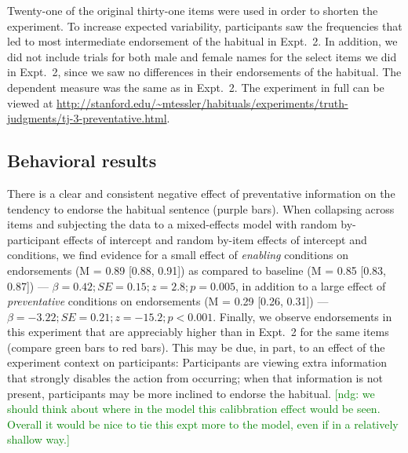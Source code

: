 \documentclass[10pt,letterpaper]{article}
\newcommand{\ndg}[1]{\textcolor{Green}{[ndg: #1]}}
\begin{document}
Twenty-one of the original thirty-one items were used in order to shorten the experiment.
To increase expected variability, participants saw the frequencies that led to most intermediate endorsement of the habitual in Expt.~2. 
In addition, we did not include trials for both male and female names for the select items we did in Expt.~2, since we saw no differences in their endorsements of the habitual.
The dependent measure was the same as in Expt.~2. 
The experiment in full can be viewed at \url{http://stanford.edu/~mtessler/habituals/experiments/truth-judgments/tj-3-preventative.html}.

\subsection{Behavioral results}

There is a clear and consistent negative effect of preventative information on the tendency to endorse the habitual sentence (purple bars).
When collapsing across items and subjecting the data to a mixed-effects model with random by-participant effects of intercept and random by-item effects of intercept and conditions, we find evidence for a small effect of \emph{enabling} conditions on endorsements (M =  0.89 [0.88, 0.91]) as compared to baseline (M = 0.85 [0.83, 0.87]) --- $\beta = 0.42; SE = 0.15; z = 2.8; p = 0.005$, in addition to a large effect of \emph{preventative} conditions on endorsements (M = 0.29 [0.26, 0.31]) --- $\beta = -3.22; SE = 0.21; z = -15.2; p < 0.001$. 
Finally, we observe endorsements in this experiment that are appreciably higher than in Expt.~2 for the same items (compare green bars to red bars).
This may be due, in part, to an effect of the experiment context on participants: Participants are viewing extra information that strongly disables the action from occurring; when that information is not present, participants may be more inclined to endorse the habitual.
\ndg{we should think about where in the model this calibbration effect would be seen. Overall it would be nice to tie this expt more to the model, even if in a relatively shallow way.}

\end{document}
